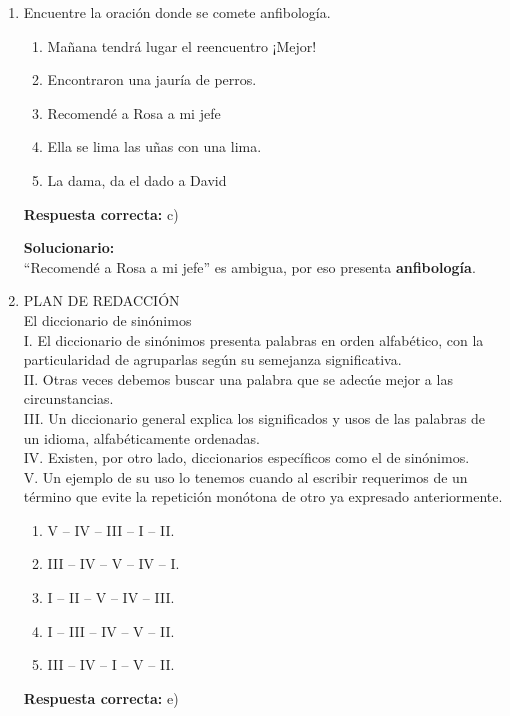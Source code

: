 \begin{enumerate}
	\vspace{2mm}
	\textbf{Solucionario:}\\
	“Displicencia” implica desdén o falta de consideración; su antónimo es \textbf{deferencia}.
	
	\vspace{6mm}
	
	\item Encuentre la oración donde se comete anfibología.
	\begin{enumerate}[label=\alph*)]
		\item Mañana tendrá lugar el reencuentro ¡Mejor!
		\item Encontraron una jauría de perros.
		\item Recomendé a Rosa a mi jefe
		\item Ella se lima las uñas con una lima.
		\item La dama, da el dado a David
	\end{enumerate}
	\textbf{Respuesta correcta:} c)
	
	\vspace{2mm}
	\textbf{Solucionario:}\\
	“Recomendé a Rosa a mi jefe” es ambigua, por eso presenta \textbf{anfibología}.
	
	\vspace{6mm}
	
	\item PLAN DE REDACCIÓN\\
	El diccionario de sinónimos\\
	I. El diccionario de sinónimos presenta palabras en orden alfabético, con la particularidad de agruparlas según su semejanza significativa.\\
	II. Otras veces debemos buscar una palabra que se adecúe mejor a las circunstancias.\\
	III. Un diccionario general explica los significados y usos de las palabras de un idioma, alfabéticamente ordenadas.\\
	IV. Existen, por otro lado, diccionarios específicos como el de sinónimos.\\
	V. Un ejemplo de su uso lo tenemos cuando al escribir requerimos de un término que evite la repetición monótona de otro ya expresado anteriormente.
	\begin{enumerate}[label=\alph*)]
		\item V – IV – III – I – II.
		\item III – IV – V – IV – I.
		\item I – II – V – IV – III.
		\item I – III – IV – V – II.
		\item III – IV – I – V – II.
	\end{enumerate}
	\textbf{Respuesta correcta:} e)
	

\end{enumerate}
